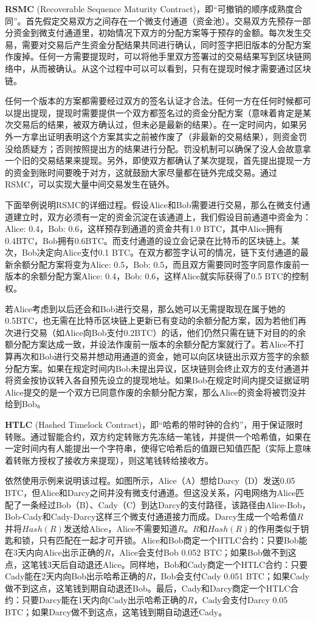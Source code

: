 \documentclass[12pt,a4paper]{article}
\begin{document}
\textbf{RSMC} (Recoverable Sequence Maturity Contract)，即“可撤销的顺序成熟度合同”。首先假定交易双方之间存在一个微支付通道（资金池）。交易双方先预存一部分资金到微支付通道里，初始情况下双方的分配方案等于预存的金额。每次发生交易，需要对交易后产生资金分配结果共同进行确认，同时签字把旧版本的分配方案作废掉。任何一方需要提现时，可以将他手里双方签署过的交易结果写到区块链网络中，从而被确认。从这个过程中可以可以看到，只有在提现时候才需要通过区块链。

任何一个版本的方案都需要经过双方的签名认证才合法。任何一方在任何时候都可以提出提现，提现时需要提供一个双方都签名过的资金分配方案（意味着肯定是某次交易后的结果，被双方确认过，但未必是最新的结果）。在一定时间内，如果另外一方拿出证明表明这个方案其实之前被作废了（非最新的交易结果），则资金罚没给质疑方；否则按照提出方的结果进行分配。罚没机制可以确保了没人会故意拿一个旧的交易结果来提现。另外，即使双方都确认了某次提现，首先提出提现一方的资金到账时间要晚于对方，这就鼓励大家尽量都在链外完成交易。通过 RSMC，可以实现大量中间交易发生在链外。

下面举例说明RSMC的详细过程。假设Alice和Bob需要进行交易，那么在微支付通道建立时，双方必须有一定的资金沉淀在该通道上，我们假设目前通道中资金为：Alice: 0.4，Bob: 0.6，这样预存到通道的资金共有1.0 BTC，其中Alice拥有0.4BTC，Bob拥有0.6BTC。而支付通道的设立会记录在比特币的区块链上。某次，Bob决定向Alice支付0.1 BTC。在双方都签字认可的情况，链下支付通道的最新余额分配方案将变为{Alice: 0.5，Bob: 0.5}，而且双方需要同时签字同意作废前一版本的余额分配方案{Alice: 0.4，Bob: 0.6}，这样Alice就实际获得了0.5 BTC的控制权。

若Alice考虑到以后还会和Bob进行交易，那么她可以无需提取现在属于她的0.5BTC，也无需在比特币区块链上更新已有变动的余额分配方案，因为若他们再次进行交易（如Alice向Bob支付0.2BTC）的话，他们仍然只需在链下对目的的余额分配方案达成一致，并设法作废前一版本的余额分配方案就行了。若Alice不打算再次和Bob进行交易并想动用通道的资金，她可以向区块链出示双方签字的余额分配方案。如果在规定时间内Bob未提出异议，区块链则会终止双方的支付通道并将资金按协议转入各自预先设立的提现地址。如果Bob在规定时间内提交证据证明Alice提交的是一个双方已同意作废的余额分配方案，那么Alice的资金将被罚没并给到Bob。

\textbf{HTLC} (Hashed Timelock Contract)，即“哈希的带时钟的合约”，用于保证限时转账。通过智能合约，双方约定转账方先冻结一笔钱，并提供一个哈希值，如果在一定时间内有人能提出一个字符串，使得它哈希后的值跟已知值匹配（实际上意味着转账方授权了接收方来提现），则这笔钱转给接收方。

依然使用示例来说明该过程。如图所示，Alice（A）想给Darcy（D）发送0.05 BTC，但Alice和Darcy之间并没有微支付通道。但这没关系，闪电网络为Alice匹配了一条经过Bob（B）、Cady（C）到达Darcy的支付路径，该路径由Alice-Bob，Bob-Cady和Cady-Darcy这样三个微支付通道接力而成。Darcy生成一个哈希值$R$并将$Hash(R)$发送给Alice，Alice不需要知道$R$。$R$和$Hash(R)$的作用类似于钥匙和锁，只有匹配在一起才可开锁。Alice和Bob商定一个HTLC合约：只要Bob能在3天内向Alice出示正确的$R$，Alice会支付Bob 0.052 BTC；如果Bob做不到这点，这笔钱3天后自动退还Alice。同样地，Bob和Cady商定一个HTLC合约：只要Cady能在2天内向Bob出示哈希正确的$R$，Bob会支付Cady 0.051 BTC；如果Cady做不到这点，这笔钱到期自动退还Bob。最后，Cady和Darcy商定一个HTLC合约：只要Darcy能在1天内向Cady出示哈希正确的$R$，Cady会支付Darcy 0.05 BTC；如果Darcy做不到这点，这笔钱到期自动退还Cady。
\end{document}
